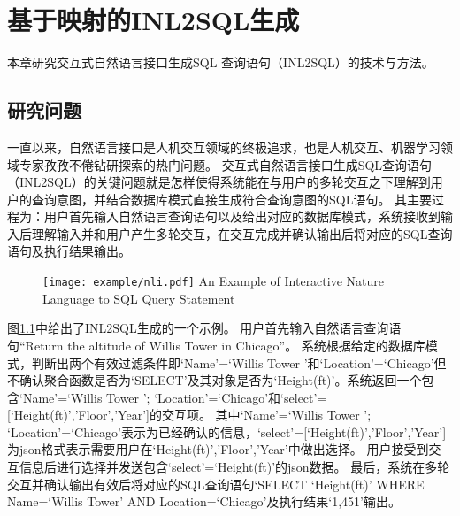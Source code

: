\chapter{基于映射的INL2SQL生成}
\label{chap:interaction}
本章研究交互式自然语言接口生成SQL 查询语句（INL2SQL）的技术与方法。

\section{研究问题}

一直以来，自然语言接口是人机交互领域的终极追求，也是人机交互、机器学习领域专家孜孜不倦钻研探索的热门问题。
交互式自然语言接口生成SQL查询语句（INL2SQL）的关键问题就是怎样使得系统能在与用户的多轮交互之下理解到用户的查询意图，并结合数据库模式直接生成符合查询意图的SQL语句。
其主要过程为：用户首先输入自然语言查询语句以及给出对应的数据库模式，系统接收到输入后理解输入并和用户产生多轮交互，在交互完成并确认输出后将对应的SQL查询语句及执行结果输出。

\begin{figure}[!htp]
  \centering
  \texttt{[image: example/nli.pdf]}
    {An Example of Interactive Nature Language to SQL Query Statement}
  \label{fig:NLI}
\end{figure}

图\ref{fig:NLI}中给出了INL2SQL生成的一个示例。
用户首先输入自然语言查询语句“Return the altitude of Willis Tower in Chicago”。
系统根据给定的数据库模式，判断出两个有效过滤条件即‘Name’=‘Willis Tower ’和‘Location’=‘Chicago’但不确认聚合函数是否为‘SELECT’及其对象是否为‘Height(ft)’。系统返回一个包含{‘Name’=‘Willis Tower ’; ‘Location’=‘Chicago’}和{‘select’=[‘Height(ft)’,’Floor’,’Year’]}的交互项。
其中{‘Name’=‘Willis Tower ’; ‘Location’=‘Chicago’}表示为已经确认的信息，{‘select’=[‘Height(ft)’,’Floor’,’Year’]}为json格式表示需要用户在‘Height(ft)’,’Floor’,’Year’中做出选择。
用户接受到交互信息后进行选择并发送包含{‘select’=‘Height(ft)’}的json数据。
最后，系统在多轮交互并确认输出有效后将对应的SQL查询语句‘SELECT ‘Height(ft)’ WHERE Name=‘Willis Tower’ AND Location=‘Chicago’及执行结果‘1,451’输出。



